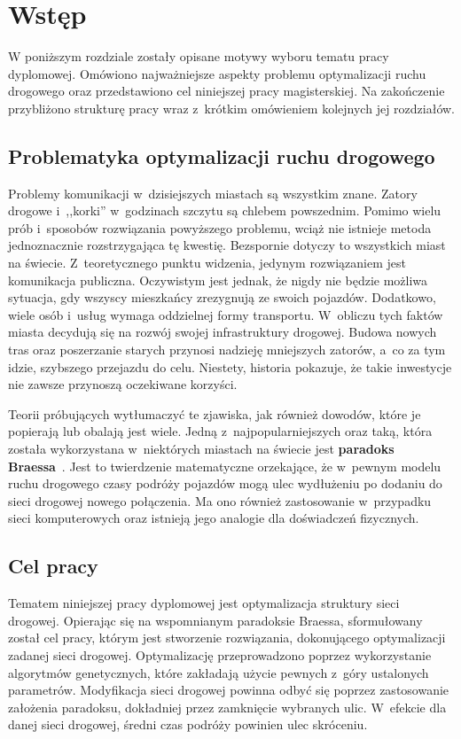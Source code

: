 \documentclass[twoside,12pt]{report}
\let\oldsection\chapter
\def\chapter{\cleardoublepage\oldsection}
\begin{document}

\tableofcontents	%

\chapter{Wstęp}\label{rozdz.wstep} 
W poniższym rozdziale zostały opisane motywy wyboru tematu pracy dyplomowej. Omówiono najważniejsze aspekty problemu optymalizacji ruchu drogowego oraz przedstawiono cel niniejszej pracy magisterskiej. Na zakończenie przybliżono strukturę pracy wraz z~krótkim omówieniem kolejnych jej rozdziałów.

\section{Problematyka optymalizacji ruchu drogowego}
Problemy komunikacji w~dzisiejszych miastach są wszystkim znane. Zatory drogowe i~,,korki'' w~godzinach szczytu są chlebem powszednim. Pomimo wielu prób i~sposobów rozwiązania powyższego problemu, wciąż nie istnieje metoda jednoznacznie rozstrzygająca tę kwestię. Bezspornie dotyczy to wszystkich miast na świecie. Z~teoretycznego punktu widzenia, jedynym rozwiązaniem jest komunikacja publiczna. Oczywistym jest jednak, że nigdy nie będzie możliwa sytuacja, gdy wszyscy mieszkańcy zrezygnują ze swoich pojazdów. Dodatkowo, wiele osób i~usług wymaga oddzielnej formy transportu. W~obliczu tych faktów miasta decydują się na rozwój swojej infrastruktury drogowej. Budowa nowych tras oraz poszerzanie starych przynosi nadzieję mniejszych zatorów, a~co za tym idzie, szybszego przejazdu do celu. Niestety, historia pokazuje, że takie inwestycje nie zawsze przynoszą oczekiwane korzyści.

Teorii próbujących wytłumaczyć te zjawiska, jak również dowodów, które je popierają lub obalają jest wiele. Jedną z~najpopularniejszych oraz taką, która została wykorzystana w~niektórych miastach na świecie jest \textbf{paradoks Braessa}~\cite{braess}. Jest to twierdzenie matematyczne orzekające, że w~pewnym modelu ruchu drogowego czasy podróży pojazdów mogą ulec wydłużeniu po dodaniu do sieci drogowej nowego połączenia. Ma ono również  zastosowanie w~przypadku  sieci komputerowych oraz istnieją jego analogie dla doświadczeń fizycznych.

\section{Cel pracy}
Tematem niniejszej pracy dyplomowej jest optymalizacja struktury sieci drogowej. Opierając się na wspomnianym paradoksie Braessa, sformułowany został cel pracy, którym jest stworzenie rozwiązania, dokonującego optymalizacji zadanej sieci drogowej. Optymalizację przeprowadzono poprzez wykorzystanie algorytmów genetycznych, które zakładają użycie pewnych z~góry ustalonych parametrów. Modyfikacja sieci drogowej powinna odbyć się poprzez zastosowanie założenia paradoksu, dokładniej przez zamknięcie wybranych ulic.  W~efekcie dla danej sieci drogowej, średni czas podróży powinien ulec skróceniu.
\end{document}
